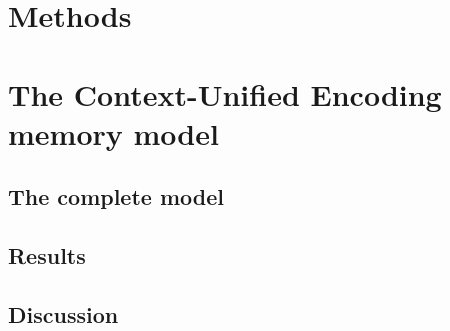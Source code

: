 \documentclass[letterpaper,12pt,titlepage,oneside,final]{scrbook}
\begin{document}
 


\part{Methods}





\part{The Context-Unified Encoding memory model}





\chapter{The complete model}
\chapter{Results}
\chapter{Discussion}
\end{document}
